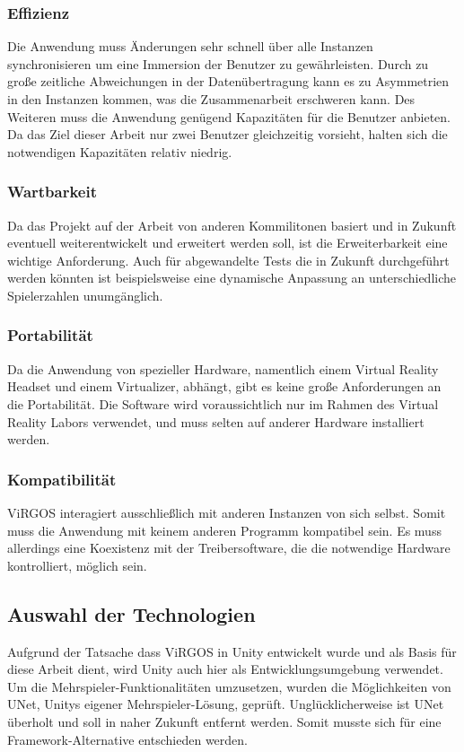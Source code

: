 \subsubsection*{Effizienz}
Die Anwendung muss Änderungen sehr schnell über alle Instanzen synchronisieren um eine Immersion der Benutzer zu gewährleisten. Durch zu große zeitliche Abweichungen in der Datenübertragung kann es zu Asymmetrien in den Instanzen kommen, was die Zusammenarbeit erschweren kann. Des Weiteren muss die Anwendung genügend Kapazitäten für die Benutzer anbieten. Da das Ziel dieser Arbeit nur zwei Benutzer gleichzeitig vorsieht, halten sich die notwendigen Kapazitäten relativ niedrig. 

\subsubsection*{Wartbarkeit}
Da das Projekt auf der Arbeit von anderen Kommilitonen basiert und in Zukunft eventuell weiterentwickelt und erweitert werden soll, ist die Erweiterbarkeit eine wichtige Anforderung. Auch für abgewandelte Tests die in Zukunft durchgeführt werden könnten ist beispielsweise eine dynamische Anpassung an unterschiedliche Spielerzahlen unumgänglich.

\subsubsection*{Portabilität}
Da die Anwendung von spezieller Hardware, namentlich einem Virtual Reality Headset und einem Virtualizer, abhängt, gibt es keine große Anforderungen an die Portabilität. Die Software wird voraussichtlich nur im Rahmen des Virtual Reality Labors verwendet, und muss selten auf anderer Hardware installiert werden.

\subsubsection*{Kompatibilität}
ViRGOS interagiert ausschließlich mit anderen Instanzen von sich selbst. Somit muss die Anwendung mit keinem anderen Programm kompatibel sein. Es muss allerdings eine Koexistenz mit der Treibersoftware, die die notwendige Hardware kontrolliert, möglich sein. 

\newpage

\subsection{Auswahl der Technologien}
Aufgrund der Tatsache dass ViRGOS in Unity entwickelt wurde und als Basis für diese Arbeit dient, wird Unity auch hier als Entwicklungsumgebung verwendet. Um die Mehrspieler-Funktionalitäten umzusetzen, wurden die Möglichkeiten von UNet, Unitys eigener Mehrspieler-Lösung, geprüft. Unglücklicherweise ist UNet überholt und soll in naher Zukunft entfernt werden. Somit musste sich für eine Framework-Alternative entschieden werden.

